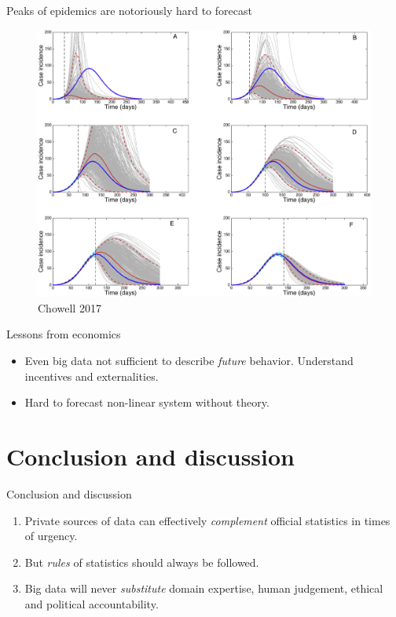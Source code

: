 \documentclass[
  ignorenonframetext,
  aspectratio=1610,
]{beamer}
\providecommand{\tightlist}{%
  \setlength{\itemsep}{0pt}\setlength{\parskip}{0pt}}
\begin{document}
\begin{frame}{Peaks of epidemics are notoriously hard to forecast}
\protect\hypertarget{peaks-of-epidemics-are-notoriously-hard-to-forecast}{}
\begin{figure}
\centering
\includegraphics[width=\textwidth,height=0.8\textheight]{exhibit/fig/nonlinear.jpg}
\caption{Chowell 2017}
\end{figure}
\end{frame}

\begin{frame}{Lessons from economics}
\protect\hypertarget{lessons-from-economics}{}
\begin{itemize}
\tightlist
\item
  Even big data not sufficient to describe \emph{future} behavior.
  Understand incentives and externalities.
\item
  Hard to forecast non-linear system without theory.
\end{itemize}
\end{frame}

\hypertarget{conclusion-and-discussion}{%
\section{Conclusion and discussion}\label{conclusion-and-discussion}}

\begin{frame}{Conclusion and discussion}
\protect\hypertarget{conclusion-and-discussion-1}{}
\begin{enumerate}
\tightlist
\item
  Private sources of data can effectively \emph{complement} official
  statistics in times of urgency.
\item
  But \emph{rules} of statistics should always be followed.
\item
  Big data will never \emph{substitute} domain expertise, human
  judgement, ethical and political accountability.
\end{enumerate}
\end{frame}
\end{document}
